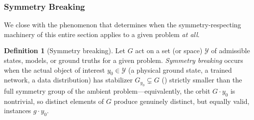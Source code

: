 \documentclass[11pt]{article}
\theoremstyle{plain}
\theoremstyle{definition}
\newtheorem{Definition}{Definition}[section]
\begin{document}
\subsubsection{Symmetry Breaking}
\label{subsec:symmetry-breaking}

We close with the phenomenon that determines when the symmetry-respecting
machinery of this entire section applies to a given problem \emph{at all}.

\begin{Definition}[Symmetry breaking]
\label{def:symmetry-breaking}
Let $G$ act on a set (or space) $\mathcal{Y}$ of admissible states, models, or ground
truths for a given problem. \emph{Symmetry breaking} occurs when the actual
object of interest $y_0 \in \mathcal{Y}$ (a physical ground state, a trained network,
a data distribution) has stabilizer $G_{y_0} \subsetneq G$
() strictly smaller than the full
symmetry group of the ambient problem---equivalently, the orbit
$G \cdot y_0$ is nontrivial, so distinct elements of $G$ produce genuinely
distinct, but equally valid, instances $g \cdot y_0$.
\end{Definition}
\end{document}
